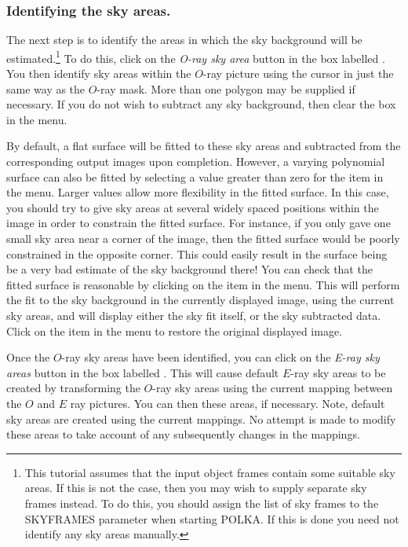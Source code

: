 \subsubsection {Identifying the sky areas.}
The next step is to identify the areas in which the sky background will
be estimated.\footnote{This tutorial assumes that the input object frames
contain some suitable sky areas. If this is not the case, then you may
wish to supply separate sky frames instead. To do this, you should assign
the list of sky frames to the SKYFRAMES parameter when starting POLKA. If
this is done you need not identify any sky areas manually.} To do this,
click on the {\em O-ray sky area} button in the box labelled
. You then identify sky areas
within the $O$-ray picture using the cursor in just the same way as the
$O$-ray mask. More than one polygon may be supplied if necessary. If you
do not wish to subtract any sky background, then clear the
 box in the
 menu.

By default, a flat surface will be fitted to these sky areas and
subtracted from the corresponding output images upon completion. However,
a varying polynomial surface can also be fitted by selecting a value
greater than zero for the  item
in the  menu. Larger values
allow more flexibility in the fitted surface. In this case, you should
try to give sky areas at several widely spaced positions within the image
in order to constrain the fitted surface. For instance, if you only gave
one small sky area near a corner of the image, then the fitted surface
would be poorly constrained in the opposite corner. This could easily
result in the surface being be a very bad estimate of the sky background
there! You can check that the fitted surface is reasonable by clicking on
the  item in the
 menu. This will perform
the fit to the sky background in the currently displayed image, using the
current sky areas, and will display either the sky fit itself, or the sky
subtracted data. Click on the 
 item in the 
 menu to restore the original
displayed image.

Once the $O$-ray sky areas have been identified, you can click on the
{\em E-ray sky areas} button in the box labelled . This will cause default $E$-ray sky areas to
be created by transforming the $O$-ray sky areas using the current
mapping between the $O$ and $E$ ray pictures. You can then
 these
areas, if necessary. Note, default sky areas are created using the
current mappings. No attempt is made to modify these areas to take
account of any subsequently changes in the mappings.

